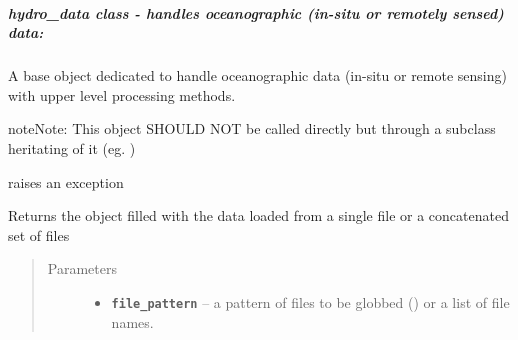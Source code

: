 \documentclass[letterpaper,10pt,english]{sphinxmanual}
\begin{document}
\subparagraph{hydro\_data class - handles oceanographic (in-situ or remotely sensed) data:}
\label{altimetry.data:hydro-data-class-handles-oceanographic-in-situ-or-remotely-sensed-data}\label{altimetry.data:hydro-data}

\begin{fulllineitems}
\label{altimetry.data:altimetry.data.hydro_data}
A base object dedicated to handle oceanographic data (in-situ or remote sensing) with upper level processing methods.

\begin{notice}{note}{Note:}
This object SHOULD NOT be called directly but through a subclass heritating of it (eg. {\hyperref[altimetry.data:altimetry.data.alti_data]{\emph{}}})
\end{notice}

\begin{fulllineitems}
\label{altimetry.data:altimetry.data.hydro_data.Error}
raises an exception

\end{fulllineitems}


\begin{fulllineitems}
\label{altimetry.data:altimetry.data.hydro_data.__init__}
Returns the object filled with the data loaded from a single file or a concatenated set of files
\begin{quote}\begin{description}
\item[{Parameters}] \leavevmode\begin{itemize}
\item {} 
\textbf{\texttt{file\_pattern}} -- a pattern of files to be globbed (\href{http://docs.python.org/library/glob.html\#glob.glob}{}) or a list of file names.


\end{itemize}
\end{description}
\end{quote}
\end{fulllineitems}
\end{fulllineitems}
\end{document}

